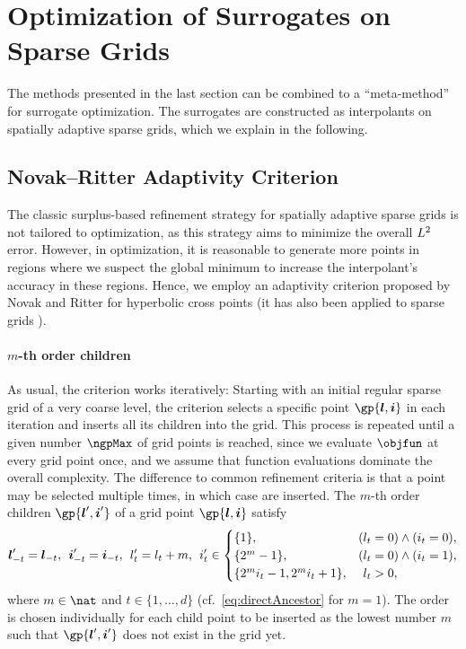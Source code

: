 \section{Optimization of Surrogates on Sparse Grids}
\label{sec:52method}

The methods presented in the last section can be combined to a
``meta-method'' for surrogate optimization.
The surrogates are constructed as interpolants on spatially adaptive
sparse grids, which we explain in the following.



\subsection{Novak--Ritter Adaptivity Criterion}
\label{sec:521novakRitter}

The classic surplus-based refinement strategy for
spatially adaptive sparse grids is not tailored to optimization,
as this strategy aims to minimize the overall $L^2$ error.
However, in optimization, it is reasonable to generate more
points in regions where we suspect the global minimum
to increase the interpolant's accuracy in these regions.
Hence, we employ an adaptivity criterion proposed by
Novak and Ritter \cite{Novak96Global} for hyperbolic cross points
(it has also been applied to sparse grids
).

\paragraph{$m$-th order children}

As usual, the criterion works iteratively:
Starting with an initial regular sparse grid of a very coarse level,
the criterion selects a specific point $\gp{\*l,\*i}$ in each iteration
and inserts all its children into the grid.
This process is repeated until a given number $\ngpMax$ of grid points is
reached,
since we evaluate $\objfun$ at every grid point once, and we assume that
function evaluations dominate the overall complexity.
The difference to common refinement criteria is that
a point may be selected multiple times, in which case
 are inserted.
The $m$-th order children $\gp{\*l',\*i'}$ of a grid point $\gp{\*l,\*i}$
satisfy
\begin{equation}
  \label{eq:indirectChild}
  {\boldsymbol{l}}'_{-t} = {\boldsymbol{l}}_{-t},\;\,
  {\boldsymbol{i}}'_{-t} = {\boldsymbol{i}}_{-t},\;\,
  l'_t = l_t + m,\;\,
  i'_t \in
  \begin{cases}
    \{1\},&(l_t = 0) \land (i_t = 0),\\
    \{2^m - 1\},&(l_t = 0) \land (i_t = 1),\\
    \{2^m i_t - 1, 2^m i_t + 1\},&\hphantom{(}l_t > 0,
  \end{cases}
\end{equation}
where $m \in \nat$ and $t \in \{1, \dotsc, d\}$
(cf.\ \eqref{eq:directAncestor} for $m = 1$).
The order is chosen individually for each child point to be inserted
as the lowest number $m$ such that $\gp{\*l',\*i'}$ does not exist
in the grid yet.

